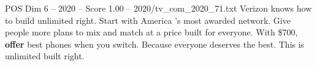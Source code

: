 \begin{textsample}{POS Dim 6 – 2020 – Score 1.00 – 2020/tv\_com\_2020\_71.txt}  \label{ex:f6_pos_044}
Verizon knows how to build unlimited right.
Start with America 's most awarded network.
Give people more plans to mix and match at a price built for everyone.
With \$700, \textbf{offer} best phones when you switch.
Because everyone deserves the best.
This is unlimited built right.

\end{textsample}
